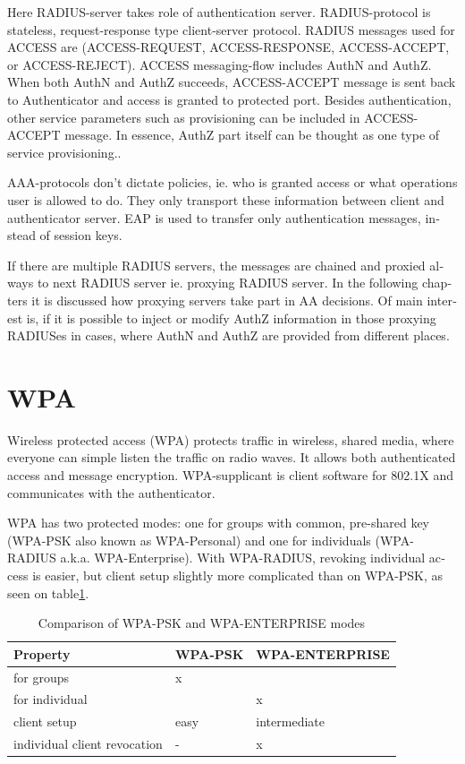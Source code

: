 \documentclass[12pt,a4paper,english]{tutthesis}
\begin{document}
\begin{otherlanguage}{english}
Here RADIUS-server takes role of authentication server.
RADIUS-protocol is stateless, request-response type client-server
protocol.  RADIUS messages used for ACCESS are (ACCESS-REQUEST,
ACCESS-RESPONSE, ACCESS-ACCEPT, or ACCESS-REJECT). ACCESS
messaging-flow includes AuthN and AuthZ. When both AuthN and AuthZ
succeeds, ACCESS-ACCEPT message is sent back to Authenticator and
access is granted to protected port.  Besides authentication, other
service parameters such as provisioning can be included in
ACCESS-ACCEPT message. In essence, AuthZ part itself can be thought as
one type of service provisioning.\cite{rfc5608}.




AAA-protocols don't dictate policies, ie. who is granted access or
what operations user is allowed to do. They only transport these information
between client and authenticator server.
EAP is used to transfer only authentication messages, instead   of
session keys. 

If there are multiple RADIUS servers, the messages are chained and
proxied always to next RADIUS server ie. proxying RADIUS server.
In the following chapters it is discussed how proxying servers take 
part in AA decisions. Of main interest is, if it is possible 
to inject or modify AuthZ information in those proxying RADIUSes in cases, 
where AuthN and AuthZ are provided from different
places\cite{rfc2607}.


\section{WPA}
\label{sec-2-3}

Wireless protected access (WPA) protects traffic in wireless,
shared media, where everyone can simple listen the traffic on
radio waves. It allows both authenticated access and message
encryption.
WPA-supplicant is client software for 802.1X and communicates with the authenticator.

WPA has two protected modes: one for groups with common, pre-shared
key (WPA-PSK also known as WPA-Personal) and one for individuals
(WPA-RADIUS a.k.a. WPA-Enterprise).  With WPA-RADIUS, revoking
individual access is easier, but client setup slightly more
complicated than on WPA-PSK, as seen on table\ref{psk-enterprise}.

\begin{table}[htb]
\caption{\label{psk-enterprise}Comparison of WPA-PSK and WPA-ENTERPRISE modes}
\centering
\begin{tabular}{lll}
Property & WPA-PSK & WPA-ENTERPRISE\\
\hline
for groups & x & \\
for individual &  & x\\
client setup & easy & intermediate\\
individual client revocation & - & x\\
\hline
\end{tabular}
\end{table}


\end{otherlanguage}
\end{document}
